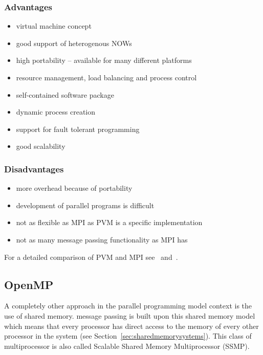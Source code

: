 \subsubsection{Advantages}
\begin{itemize}
\item virtual machine concept
\item good support of heterogenous NOWs
\item high portability -- available for many different platforms
\item resource management, load balancing and process control
\item self-contained software package
\item dynamic process creation
\item support for fault tolerant programming
\item good scalability
\end{itemize}

\subsubsection{Disadvantages}
\begin{itemize}
\item more overhead because of portability
\item development of parallel programs is difficult
\item not as flexible as MPI as PVM is a specific implementation
\item not as many message passing functionality as MPI has
\end{itemize}


For a detailed comparison of PVM and MPI see~\cite{geist96pam}
and~\cite{gropp02ggd}.

\subsection{OpenMP}
\label{sec:OpenMP}

A completely other approach in the parallel programming model context
is the use of shared memory. message passing is built upon this shared
memory model which means that every processor has direct access to the
memory of every other processor in the system
(see Section~\ref{sec:sharedmemorysystems}). This class of
multiprocessor is also called Scalable Shared Memory Multiprocessor
(SSMP).

